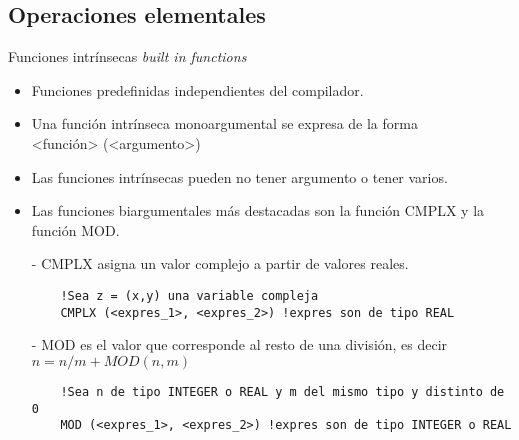 
\subsection{Operaciones elementales}


\begin{frame}[fragile]{Funciones intrínsecas \textit{built in functions}}  
 \begin{itemize}[<+(0)->]
  \item Funciones predefinidas independientes del compilador. 
    \item Una función intrínseca monoargumental se expresa de la forma \\
      \centering <función> (<argumento>)\\ 
  \item Las funciones intrínsecas pueden no tener argumento o tener varios.
  \item Las funciones biargumentales más destacadas son la función CMPLX y la función MOD.
  \item [-] CMPLX asigna un valor complejo a partir de valores reales.
  \vspace{0.1cm} 
   \begin{verbatim}
    !Sea z = (x,y) una variable compleja
    CMPLX (<expres_1>, <expres_2>) !expres son de tipo REAL
   \end{verbatim}
  \vspace{0.2cm}
  \item [-] MOD es el valor que corresponde al resto de una división, es decir\\
      \centering $n = n/m + MOD(n, m) $
  \vspace{0.15cm} 
   \begin{verbatim}
    !Sea n de tipo INTEGER o REAL y m del mismo tipo y distinto de 0
    MOD (<expres_1>, <expres_2>) !expres son de tipo INTEGER o REAL
   \end{verbatim}  
 \end{itemize}
\end{frame}

